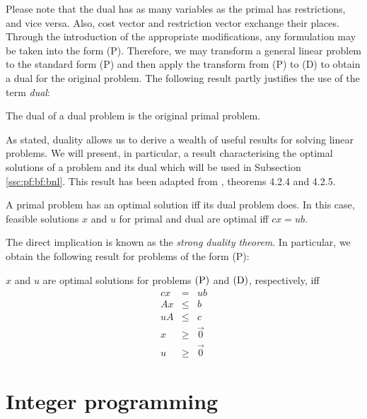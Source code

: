 Please note that the dual has as many variables as the primal has restrictions,
and vice versa. Also, cost vector and restriction vector exchange their places.
Through the introduction of the appropriate modifications, any formulation may
be taken into the form (P). Therefore, we may transform a general linear problem
to the standard form (P) and then apply the transform from (P) to (D) to obtain
a dual for the original problem. The following result partly justifies the use
of the term \emph{dual}:

\begin{proposition}
    \label{pro:dual-of-dual}
    
    The dual of a dual problem is the original primal problem.
\end{proposition}

\noindent
As stated, duality allows us to derive a wealth of useful results for solving
linear problems. We will present, in particular, a result characterising the
optimal solutions of a problem and its dual which will be used in Subsection
\ref{ssc:pf:bf:bnl}. This result has been adapted from \cite{si:opt}, theorems
4.2.4 and 4.2.5.

\begin{proposition}
    \label{pro:strong-duality-theorem}
    
    A primal problem has an optimal solution iff its dual problem does. In this
    case, feasible solutions $x$ and $u$ for primal and dual are optimal iff $cx
    = ub$.
\end{proposition}

The direct implication is known as the \emph{strong duality theorem}. In
particular, we obtain the following result for problems of the form (P):

\begin{corollary}
    \label{cor:characterisation-of-solutions}
    
    $x$ and $u$ are optimal solutions for problems $\rm{(P)}$ and $\rm{(D)}$,
    respectively, iff
    \begin{eqnarray*}
        cx &   =& ub     \\
        Ax &\leq& b      \\
        uA &\leq& c      \\
        x  &\geq& \vec{0}\\
        u  &\geq& \vec{0}
    \end{eqnarray*}
\end{corollary}

\section{Integer programming} %
\label{sec:int:integer-programming}

